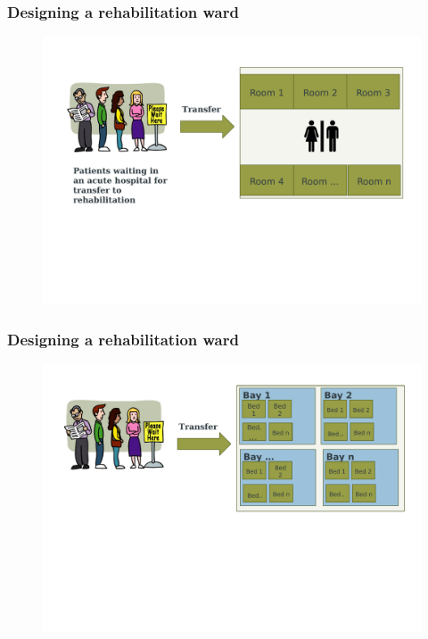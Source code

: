 \documentclass[aspectratio=169]{beamer}
\begin{document}
\begin{frame}
\frametitle{Designing a rehabilitation ward}
\begin{figure}
\includegraphics[width=0.95\linewidth]{ward1a.pdf}
\end{figure}
\end{frame}



\begin{frame}
\frametitle{Designing a rehabilitation ward}
\begin{figure}
\includegraphics[width=1.0\linewidth]{ward3a.pdf}
\end{figure}
\end{frame}
\end{document}
